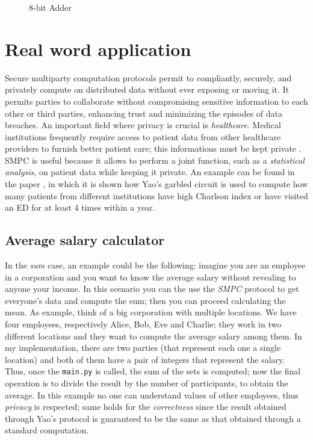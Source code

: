 \documentclass[12pt]{article}
\newcommand{\inlinecode}{\texttt}
\begin{document}
\begin{figure}[!h]
    \caption{8-bit Adder}\label{circuit}
\end{figure}

\section{Real word application}\label{sec:world}
Secure multiparty computation protocols permit to compliantly, securely, and privately compute on distributed data without ever exposing or moving it. It permits parties to collaborate without compromising sensitive information to each other or third parties, enhancing trust and minimizing the episodes of data breaches. An important field where privacy is crucial is \textit{healthcare}. Medical institutions frequently require access to patient data from other healthcare providers to furnish better patient care; this informations must be kept private \cite{application}. SMPC is useful because it allows to perform a joint function, such as a \textit{statistical analysis}, on patient data while keeping it private. An example can be found in the paper \cite{healthcare}, in which it is shown how Yao's garbled circuit is used to compute how many patients from different institutions have high Charlson index or have visited an ED for at least 4 times within a year.
\subsection{Average salary calculator}
In the \textit{sum} case, an example could be the following: imagine you are an employee in a corporation and you want to know the average salary without revealing to anyone your income. In this scenario you can the use the \textit{SMPC} protocol to get everyone's data and compute the sum; then you can proceed calculating the mean. 
As example, think of a big corporation with multiple locations. We have four employees, respectively Alice, Bob, Eve and Charlie; they work in two different locations and they want to compute the average salary among them. In my implementation, there are two parties (that represent each one a single location) and both of them have a pair of integers that represent the salary. Thus, once the \inlinecode{main.py} is called, the sum of the sets is computed; now the final operation is to divide the result by the number of participants, to obtain the average.
In this example no one can understand values of other employees, thus \textit{privacy} is respected; same holds for the \textit{correctness} since the result obtained through Yao's protocol is guaranteed to be the same as that obtained through a standard computation. 
\end{document}
